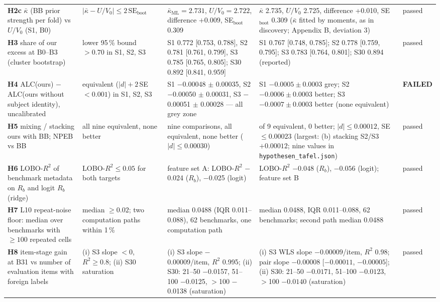\begin{table}[t]
\begin{tabular}{@{}>{\raggedright\arraybackslash}p{2.3cm}>{\raggedright\arraybackslash}p{2.0cm}>{\raggedright\arraybackslash}p{3.3cm}>{\raggedright\arraybackslash}p{4.3cm}>{\raggedright\arraybackslash}p{1.2cm}@{}}
\textbf{H2c} $\bar\kappa$ (BB prior strength per fold) vs $U/V_0$ (S1, B0) & $|\bar\kappa - U/V_0| \le 2\,\mathrm{SE}_{\mathrm{boot}}$ & $\bar\kappa_{\mathrm{ML}} = 2.731$, $U/V_0 = 2.722$, difference $+0.009$, SE$_{\mathrm{boot}}$ 0.309 & $\bar\kappa$ 2.735, $U/V_0$ 2.725, difference +0.010, SE$_{\mathrm{boot}}$ 0.309 ($\bar\kappa$ fitted by moments, as in discovery; Appendix B, deviation 3) & passed \\
\textbf{H3} share of our excess at B0--B3 (cluster bootstrap) & lower 95\,\% bound $> 0.70$ in S1, S2, S3 & S1 0.772 [0.753, 0.788], S2 0.781 [0.761, 0.799], S3 0.785 [0.765, 0.805]; S30 0.892 [0.841, 0.959] & S1 0.767 [0.748, 0.785]; S2 0.778 [0.759, 0.795]; S3 0.783 [0.764, 0.801]; S30 0.894 (reported) & passed \\
\textbf{H4} ALC(ours) $-$ ALC(ours without subject identity), uncalibrated & equivalent ($|d| + 2\,$SE $< 0.001$) in S1, S2, S3 & S1 $-$0.00048 $\pm$ 0.00035, S2 $-$0.00050 $\pm$ 0.00031, S3 $-$0.00051 $\pm$ 0.00028 — all grey zone & S1 $-0.0005 \pm 0.0003$ grey; S2 $-0.0006 \pm 0.0003$ better; S3 $-0.0007 \pm 0.0003$ better (none equivalent) & \textbf{FAILED} \\
\textbf{H5} mixing / stacking ours with BB; NPEB vs BB & all nine equivalent, none better & nine comparisons, all equivalent, none better ($|d| \le 0.00030$) & 9 of 9 equivalent, 0 better; $|d| \le 0.00012$, SE $\le 0.00023$ (largest: (b) stacking S2/S3 $+0.00012$; nine values in \texttt{hypothesen\_tafel.json}) & passed \\
\textbf{H6} LOBO-$R^2$ of benchmark metadata on $R_b$ and logit $R_b$ (ridge) & LOBO-$R^2 \le 0.05$ for both targets & feature set A: LOBO-$R^2$ $-$0.024 ($R_b$), $-$0.025 (logit) & LOBO-$R^2$ $-0.048$ ($R_b$), $-0.056$ (logit); feature set B & passed \\
\textbf{H7} L10 repeat-noise floor: median over benchmarks with $\ge 100$ repeated cells & median $\ge 0.02$; two computation paths within 1\,\% & median 0.0488 (IQR 0.011--0.088), 62 benchmarks, one computation path & median 0.0488, IQR 0.011--0.088, 62 benchmarks; second path median 0.0488 & passed \\
\textbf{H8} item-stage gain at B31 vs number of evaluation items with foreign labels & (i) S3 slope $<0$, $R^2 \ge 0.8$; (ii) S30 saturation & (i) S3 slope $-$0.00009/item, $R^2$ 0.995; (ii) S30: 21--50 $-$0.0157, 51--100 $-$0.0125, $>$100 $-$0.0138 (saturation) & (i) S3 WLS slope $-0.00009$/item, $R^2$ 0.98; pair slope $-0.00008$ [$-0.00011$, $-0.00005$]; (ii) S30: 21--50 $-0.0171$, 51--100 $-0.0123$, $>$100 $-0.0140$ (saturation) & passed \\
\bottomrule
\end{tabular}
\end{table}
